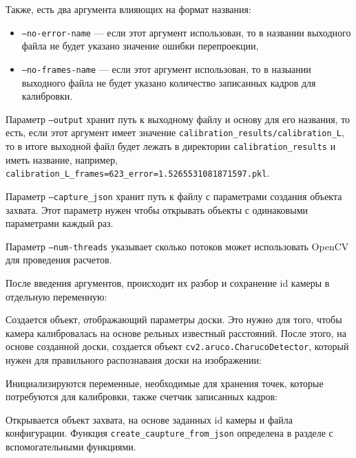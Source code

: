 \documentclass[12pt, a4paper]{article}
\begin{document}
Также, есть два аргумента влияющих на формат названия:
\begin{itemize}
  \item \texttt{--no-error-name} --- если этот аргумент использован, то в
    названии выходного файла не будет указано значение ошибки перепроекции,
  \item \texttt{--no-frames-name} --- если этот аргумент использован, то в
    назыании выходного файла не будет указано количество записанных кадров для
    калибровки.
\end{itemize}

Параметр \texttt{--output} хранит путь к выходному файлу и основу для его
названия, то есть, если этот аргумент имеет значение \texttt{calibration\_results/calibration\_L},
то в итоге выходной файл будет лежать в директории
\texttt{calibration\_results} и иметь название, например, \\
\texttt{calibration\_L\_frames=623\_error=1.5265531081871597.pkl}.

Параметр \texttt{--capture\_json} хранит путь к файлу с параметрами создания
объекта захвата. Этот параметр нужен чтобы открывать объекты с одинаковыми
параметрами каждый раз.

Параметр \texttt{--num-threads} указывает сколько потоков может использовать
OpenCV для проведения расчетов.

После введения аргументов, происходит их разбор и сохранение id камеры в
отдельную переменную:

Создается объект, отображающий параметры доски. Это нужно для того, чтобы
камера калибровалась на основе рельных известный расстояний. После этого, на основе
созданной доски, создается объект \texttt{cv2.aruco.CharucoDetector}, который
нужен для правильного распознаваия доски на изображении:

Инициализируются переменные, необходимые для хранения точек, которые потребуются
для калибровки, также счетчик записанных кадров:

Открывается объект захвата, на основе заданных id камеры и файла конфигурации.
Функция \texttt{create\_caupture\_from\_json} определена в разделе с
вспомогательными функциями.
\end{document}
